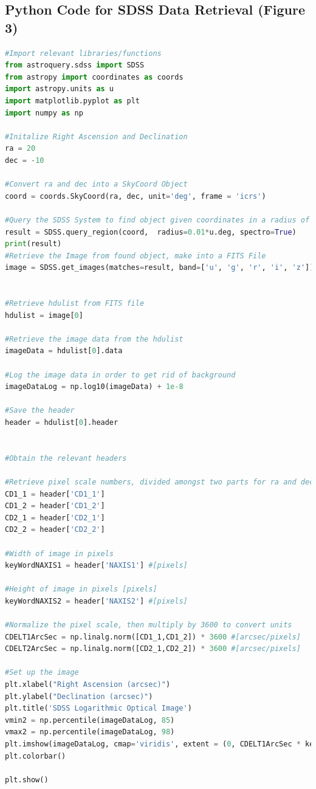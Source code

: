 \documentclass[preprint,linenumbers, longauthor]{aastex631}
\begin{document}
\begin{appendices}

\section{Python Code for SDSS Data Retrieval (Figure 3)}
\label{Appendix}
\begin{lstlisting}[language=Python]
#Import relevant libraries/functions
from astroquery.sdss import SDSS
from astropy import coordinates as coords
import astropy.units as u
import matplotlib.pyplot as plt
import numpy as np

#Initalize Right Ascension and Declination
ra = 20
dec = -10

#Convert ra and dec into a SkyCoord Object
coord = coords.SkyCoord(ra, dec, unit='deg', frame = 'icrs')

#Query the SDSS System to find object given coordinates in a radius of 0.01 degrees
result = SDSS.query_region(coord,  radius=0.01*u.deg, spectro=True)
print(result)
#Retrieve the Image from found object, make into a FITS File
image = SDSS.get_images(matches=result, band=['u', 'g', 'r', 'i', 'z'])


#Retrieve hdulist from FITS file
hdulist = image[0]

#Retrieve the image data from the hdulist 
imageData = hdulist[0].data

#Log the image data in order to get rid of background
imageDataLog = np.log10(imageData) + 1e-8

#Save the header
header = hdulist[0].header


#Obtain the relevant headers

#Retrieve pixel scale numbers, divided amongst two parts for ra and dec 
CD1_1 = header['CD1_1']
CD1_2 = header['CD1_2']
CD2_1 = header['CD2_1']
CD2_2 = header['CD2_2']

#Width of image in pixels 
keyWordNAXIS1 = header['NAXIS1'] #[pixels]

#Height of image in pixels [pixels]
keyWordNAXIS2 = header['NAXIS2'] #[pixels]

#Normalize the pixel scale, then multiply by 3600 to convert units
CDELT1ArcSec = np.linalg.norm([CD1_1,CD1_2]) * 3600 #[arcsec/pixels]
CDELT2ArcSec = np.linalg.norm([CD2_1,CD2_2]) * 3600 #[arcsec/pixels]

#Set up the image
plt.xlabel("Right Ascension (arcsec)")
plt.ylabel("Declination (arcsec)")
plt.title('SDSS Logarithmic Optical Image')
vmin2 = np.percentile(imageDataLog, 85) 
vmax2 = np.percentile(imageDataLog, 98)
plt.imshow(imageDataLog, cmap='viridis', extent = (0, CDELT1ArcSec * keyWordNAXIS1, 0, CDELT2ArcSec * keyWordNAXIS2), vmin = vmin2, vmax = vmax2)
plt.colorbar()

plt.show()

\end{lstlisting}

\end{appendices}



\end{document}
